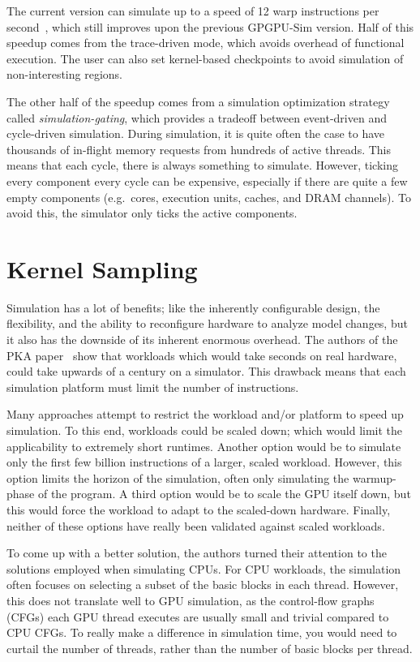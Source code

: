 The current version can simulate up to a speed of 12 warp instructions per second~\cite{accelsim}, which still improves upon the previous GPGPU-Sim version.
Half of this speedup comes from the trace-driven mode, which avoids overhead of functional execution.
The user can also set kernel-based checkpoints to avoid simulation of non-interesting regions.

The other half of the speedup comes from a simulation optimization strategy called \textit{simulation-gating}, which provides a tradeoff between event-driven and cycle-driven simulation.
During simulation, it is quite often the case to have thousands of in-flight memory requests from hundreds of active threads.
This means that each cycle, there is always something to simulate.
However, ticking every component every cycle can be expensive, especially if there are quite a few empty components (e.g.\ cores, execution units, caches, and DRAM channels).
To avoid this, the simulator only ticks the active components.

\section{Kernel Sampling}\label{sec:kernel-sampling}
Simulation has a lot of benefits; like the inherently configurable design, the flexibility, and the ability to reconfigure hardware to analyze model changes, but it also has the downside of its inherent enormous overhead.
The authors of the PKA paper~\cite{pks} show that workloads which would take seconds on real hardware, could take upwards of a century on a simulator.
This drawback means that each simulation platform must limit the number of instructions.

Many approaches attempt to restrict the workload and/or platform to speed up simulation.
To this end, workloads could be scaled down; which would limit the applicability to extremely short runtimes.
Another option would be to simulate only the first few billion instructions of a larger, scaled workload.
However, this option limits the horizon of the simulation, often only simulating the warmup-phase of the program.
A third option would be to scale the GPU itself down, but this would force the workload to adapt to the scaled-down hardware.
Finally, neither of these options have really been validated against scaled workloads.

To come up with a better solution, the authors turned their attention to the solutions employed when simulating CPUs.
For CPU workloads, the simulation often focuses on selecting a subset of the basic blocks in each thread.
However, this does not translate well to GPU simulation, as the control-flow graphs (CFGs) each GPU thread executes are usually small and trivial compared to CPU CFGs.
To really make a difference in simulation time, you would need to curtail the number of threads, rather than the number of basic blocks per thread.

